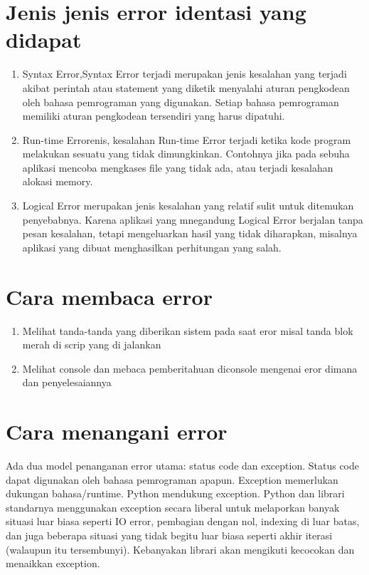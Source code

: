 \section{Jenis jenis error identasi yang didapat}
\begin{enumerate}
    \item Syntax Error,Syntax Error terjadi merupakan jenis kesalahan yang terjadi akibat perintah atau statement yang diketik menyalahi aturan pengkodean oleh bahasa pemrograman yang digunakan. Setiap bahasa pemrograman memiliki aturan pengkodean tersendiri yang harus
    dipatuhi.
    \item Run-time Errorenis, kesalahan Run-time Error terjadi ketika kode program melakukan sesuatu yang tidak dimungkinkan. Contohnya jika pada sebuha aplikasi mencoba mengkases file yang tidak ada, atau terjadi kesalahan alokasi memory.
    \item  Logical Error merupakan jenis kesalahan yang relatif sulit untuk ditemukan penyebabnya. Karena aplikasi yang mnegandung Logical Error berjalan tanpa pesan kesalahan, tetapi mengeluarkan hasil yang tidak diharapkan, misalnya aplikasi yang dibuat menghasilkan perhitungan yang salah.
\end{enumerate}
\section{Cara membaca error}
\begin{enumerate}
    \item Melihat tanda-tanda yang diberikan sistem pada saat eror misal tanda blok merah di scrip yang di jalankan
    \item Melihat console dan mebaca pemberitahuan diconsole mengenai eror dimana dan penyelesaiannya 
\end{enumerate}
\section{Cara menangani error}
Ada dua model penanganan error utama: status code dan exception. Status code dapat digunakan oleh bahasa pemrograman apapun. Exception memerlukan dukungan bahasa/runtime. 
Python mendukung exception. Python dan librari standarnya menggunakan exception secara liberal untuk melaporkan banyak situasi luar biasa seperti IO error, pembagian dengan nol, indexing di luar batas, dan juga beberapa situasi yang tidak begitu luar biasa seperti akhir iterasi (walaupun itu tersembunyi). Kebanyakan librari akan mengikuti kecocokan dan menaikkan exception.

